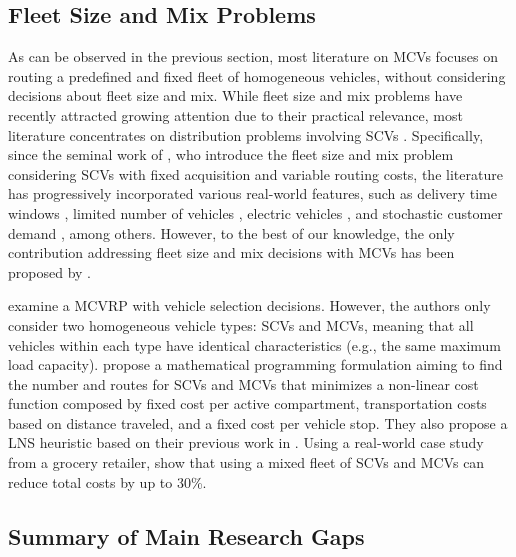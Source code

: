 \documentclass[11pt]{elsarticle}
\theoremstyle{plain}
\newcommand{\blue}[1]{#1}
\begin{document}
\subsection{Fleet Size and Mix Problems}

As can be observed in the previous section, most literature on \acp{MCV} focuses on routing a predefined and fixed fleet of homogeneous vehicles, without considering decisions about fleet size and mix. While fleet size and mix problems have recently attracted growing attention due to their practical relevance, most literature concentrates on distribution problems involving \acp{SCV} \citep{hoff2010industrial}. Specifically, since the seminal work of \cite{golden1984fleet}, who introduce the fleet size and mix problem considering \acp{SCV} with fixed acquisition and variable routing costs, the literature has progressively incorporated various real-world features, such as delivery time windows \citep{liu1999fleet, braysy2008effective, repoussis2010solving}, limited number of vehicles \citep{kocc2016thirty}, electric vehicles \citep{hiermann2016electric, gonzalez2024continuous}, and stochastic customer demand \citep{loxton2012stochastic, zinnenlauf_2024}, among others. However, to the best of our knowledge, the only contribution addressing fleet size and mix decisions with \acp{MCV} has been proposed by \cite{OstermeierHübner2018}. 

\cite{OstermeierHübner2018} examine a \ac{MCVRP} with vehicle selection decisions. However, the authors only consider two homogeneous vehicle types: \acp{SCV} and \acp{MCV}, meaning that all vehicles within each type have identical characteristics (e.g., the same maximum load capacity). \cite{OstermeierHübner2018} propose a mathematical programming formulation aiming to find the number and routes for \acp{SCV} and \acp{MCV} that minimizes a non-linear cost function composed by fixed cost per active compartment, transportation costs based on distance traveled, and a fixed cost per vehicle stop. They also propose a \ac{LNS} heuristic based on their previous work in \cite{hubner2019multi}. Using a real-world case study from a grocery retailer, \cite{OstermeierHübner2018} show that using a mixed fleet of \acp{SCV} and \acp{MCV} can reduce total costs by up to 30\%.
 
\subsection{\blue{Summary of Main} Research Gaps} \label{sec:gaps}
\end{document}
